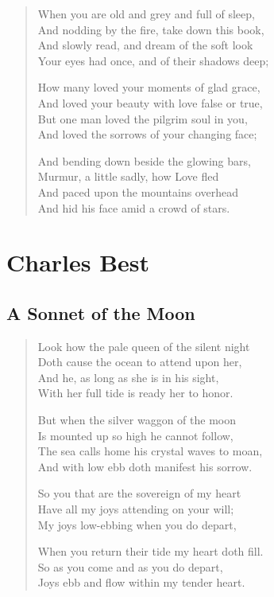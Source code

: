 \documentclass[10pt,a5paper,oneside]{book}
\begin{document}
\begin{verse}
When you are old and grey and full of sleep,\\
And nodding by the fire, take down this book,\\
And slowly read, and dream of the soft look\\
Your eyes had once, and of their shadows deep;

How many loved your moments of glad grace,\\
And loved your beauty with love false or true,\\
But one man loved the pilgrim soul in you,\\
And loved the sorrows of your changing face;

And bending down beside the glowing bars,\\
Murmur, a little sadly, how Love fled\\
And paced upon the mountains overhead\\
And hid his face amid a crowd of stars.
\end{verse}

\part{Charles Best}

\chapter{A Sonnet of the Moon}

\begin{verse}
Look how the pale queen of the silent night\\
Doth cause the ocean to attend upon her,\\
And he, as long as she is in his sight,\\
With her full tide is ready her to honor.

But when the silver waggon of the moon\\
Is mounted up so high he cannot follow,\\
The sea calls home his crystal waves to moan,\\
And with low ebb doth manifest his sorrow.

So you that are the sovereign of my heart\\
Have all my joys attending on your will;\\
My joys low-ebbing when you do depart,

When you return their tide my heart doth fill.\\
\hspace{3em}So as you come and as you do depart,\\
\hspace{3em}Joys ebb and flow within my tender heart.
\end{verse}
\end{document}
